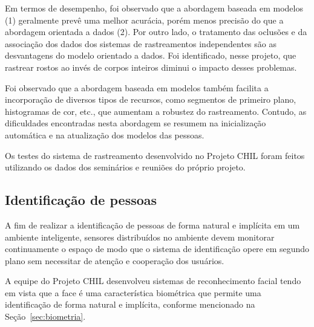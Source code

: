  Em termos de desempenho, foi observado que a abordagem baseada em modelos (1) geralmente prevê uma melhor acurácia, porém menos precisão do que a abordagem orientada a dados (2). Por outro lado, o tratamento das oclusões e da associação dos dados dos sistemas de rastreamentos independentes são as desvantagens do modelo orientado a dados. Foi identificado,  nesse projeto, que rastrear rostos ao invés de corpos inteiros diminui o impacto desses problemas.

 Foi observado que a abordagem baseada em modelos também facilita a incorporação de diversos tipos de recursos, como segmentos de primeiro plano, histogramas de cor, etc., que aumentam a robustez do rastreamento. Contudo, as dificuldades encontradas nesta abordagem se resumem na inicialização automática e na atualização dos modelos das pessoas.

 Os testes do sistema de rastreamento desenvolvido no Projeto CHIL foram feitos utilizando os dados dos seminários e reuniões do próprio projeto.



\subsection{Identificação de pessoas}


A fim de realizar a identificação de pessoas de forma natural e implícita em um ambiente inteligente, sensores distribuídos no ambiente devem monitorar continuamente o espaço de modo que o sistema de identificação opere em segundo plano sem necessitar de atenção e cooperação dos usuários. 

A equipe do Projeto CHIL desenvolveu sistemas de reconhecimento facial tendo em vista que a face é uma característica biométrica que permite uma identificação de forma natural e implícita, conforme mencionado na Seção~\ref{sec:biometria}. 

